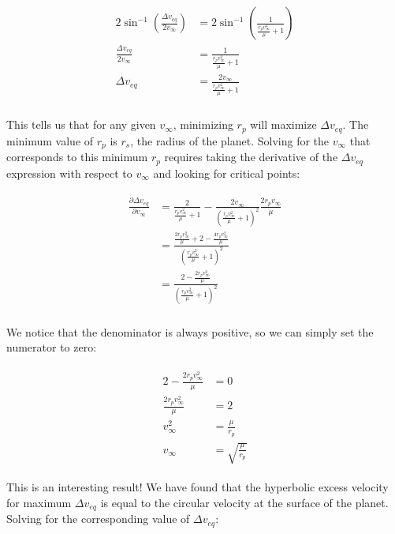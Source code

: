 \documentclass[
]{article}
\begin{document}
\[\begin{aligned}
\begin{aligned}
    2 \sin^{-1} \left( \frac{\Delta v_{eq}}{2 v_\infty} \right) &= 2 \sin^{-1} \left( \frac{1}{\frac{r_p v_\infty^2}{\mu} + 1} \right) \\
    \frac{\Delta v_{eq}}{2 v_\infty} &= \frac{1}{\frac{r_p v_\infty^2}{\mu} + 1} \\
    \Delta v_{eq} &= \frac{2 v_\infty}{\frac{r_p v_\infty^2}{\mu} + 1} \\
\end{aligned}
\end{aligned}\]

This tells us that for any given \(v_\infty\), minimizing \(r_p\) will
maximize \(\Delta v_{eq}\). The minimum value of \(r_p\) is \(r_s\), the
radius of the planet. Solving for the \(v_\infty\) that corresponds to
this minimum \(r_p\) requires taking the derivative of the
\(\Delta v_{eq}\) expression with respect to \(v_\infty\) and looking
for critical points:

\[\begin{aligned}
\begin{aligned}
    \frac{\partial \Delta v_{eq}}{\partial v_\infty} &= \frac{2}{\frac{r_p v_\infty^2}{\mu} + 1} - \frac{2 v_\infty}{\left( \frac{r_p v_\infty^2}{\mu} + 1 \right)^2} \frac{2 r_p v_\infty}{\mu} \\
    &= \frac{\frac{2r_p v_\infty^2}{\mu} + 2 - \frac{4r_p v_\infty^2}{\mu}}{\left( \frac{r_p v_\infty^2}{\mu} + 1 \right)^2} \\
    &= \frac{2 - \frac{2r_p v_\infty^2}{\mu}}{\left( \frac{r_p v_\infty^2}{\mu} + 1 \right)^2} \\
\end{aligned}
\end{aligned}\]

We notice that the denominator is always positive, so we can simply set
the numerator to zero:

\[\begin{aligned}
\begin{aligned}
    2 - \frac{2r_p v_\infty^2}{\mu} &= 0 \\
    \frac{2r_p v_\infty^2}{\mu} &= 2 \\
    v_\infty^2 &= \frac{\mu}{r_p} \\
    v_\infty &= \sqrt{\frac{\mu}{r_p}}
\end{aligned}
\end{aligned}\]

This is an interesting result! We have found that the hyperbolic excess
velocity for maximum \(\Delta v_{eq}\) is equal to the circular velocity
at the surface of the planet. Solving for the corresponding value of
\(\Delta v_{eq}\):
\end{document}
